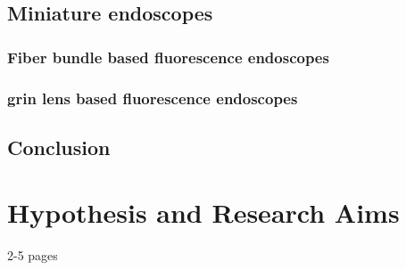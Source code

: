 \subsection{Miniature endoscopes}
\subsubsection{Fiber bundle based fluorescence endoscopes}
\subsubsection{\gls{grin} lens based fluorescence endoscopes}
\subsection{Conclusion}


\section{Hypothesis and Research Aims}
2-5 pages
